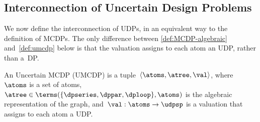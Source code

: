 \subsection{Interconnection of Uncertain Design Problems\label{sec:UMCDP}}

We now define the interconnection of UDPs, in an equivalent way to
the definition of MCDPs. The only difference between \cref{def:MCDP-algebraic}
and~\cref{def:umcdp} below is that the valuation assigns to
each atom an UDP, rather than a~DP.
\begin{definition}
\label{def:umcdp}An Uncertain MCDP (UMCDP) is a tuple~$\left\langle \atoms,\atree,\val\right\rangle $,
where~$\atoms$ is a set of atoms,~$\atree\in\terms(\{\dpseries,\dppar,\dploop\},\atoms)$
is the algebraic representation of the graph, and~$\val:\atoms\rightarrow\udpsp$
is a valuation that assigns to each atom a UDP.
\end{definition}


